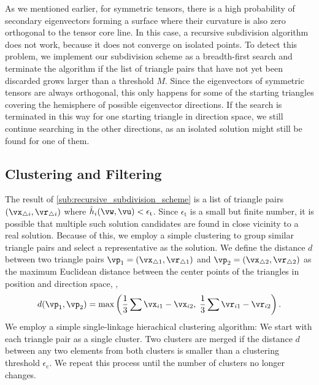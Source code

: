 %
As we mentioned earlier,  for symmetric
tensors, there is a high probability of secondary eigenvectors forming a
surface where their curvature is also zero orthogonal to the tensor core line.
%
In this case, a recursive subdivision algorithm does not work, because it does
not converge on isolated points.
%
To detect this problem, we implement our subdivision scheme as a breadth-first
search and terminate the algorithm if the list of triangle pairs that have
not yet been discarded grows larger than a threshold $M$.
%
Since the eigenvectors of symmetric tensors are always orthogonal, this only
happens for some of the starting triangles covering the hemisphere of possible
eigenvector directions.
%
If the search is terminated in this way for one starting triangle in direction
space, we still continue searching in the other directions, as an isolated
solution might still be found for one of them.
%
%

\subsection{Clustering and Filtering} %
\label{sub:clustering_and_filtering}
% 
The result of \autoref{sub:recursive_subdivision_scheme} is a list of triangle
pairs $(\vx_{\triangle i}, \vr_{\triangle i})$ where $\hat{h}_i(\vw, \vu) <
\epsilon_{\mathrm{t}}$.
%
Since $\epsilon_{\mathrm{t}}$ is a small but finite number, it is possible that
multiple such solution candidates are found in close vicinity to a real solution.
%
Because of this, we employ a simple clustering to group similar triangle pairs
and select a representative as the solution.
%
We define the distance $d$ between two triangle pairs $\vp_1 = (\vx_{\triangle 1},
\vr_{\triangle 1})$ and $\vp_2 = (\vx_{\triangle 2}, \vr_{\triangle 2})$ as the
maximum Euclidean distance between the center points of the triangles in
position and direction space, \ie,
%
\begin{equation}
  d(\vp_1, \vp_2)
    = \max\left(\frac{1}{3}\sum \vx_{i1} - \vx_{i2},
      \; \frac{1}{3}\sum \vr_{i1} - \vr_{i2}\right) \text{.}
\end{equation}
%
We employ a simple single-linkage hierachical clustering algorithm:
%
We start with each triangle pair as a single cluster.
%
Two clusters are merged if the distance $d$ between any two elements from both
clusters is smaller than a clustering threshold $\epsilon_{\mathrm{c}}$.
%
We repeat this process until the number of clusters no longer changes.
%

